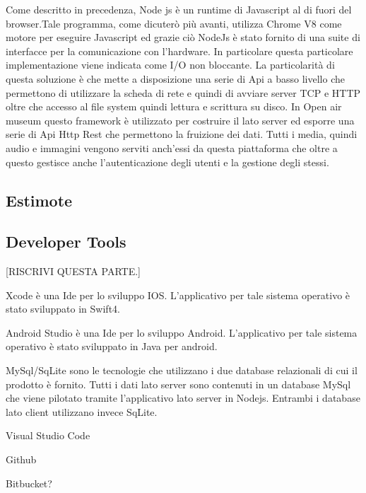 	Come descritto in precedenza, Node js è un runtime di Javascript al di fuori del browser.Tale programma, come dicuterò più avanti, utilizza Chrome V8\cite{V8} come motore per eseguire Javascript ed grazie ciò NodeJs è stato fornito di una suite di interfacce per la comunicazione con l'hardware. In particolare questa particolare implementazione viene indicata come I/O non bloccante\cite{AsincIO}. La particolarità di questa soluzione è che mette a disposizione una serie di Api a basso livello che permettono di utilizzare la scheda di rete e quindi di avviare server TCP e HTTP oltre che accesso al file system quindi lettura e scrittura su disco. In Open air museum questo framework è utilizzato per costruire il lato server ed esporre una serie di Api Http Rest che permettono la fruizione dei dati. Tutti i media, quindi audio e immagini vengono serviti anch’essi da questa piattaforma che oltre a questo gestisce anche l’autenticazione degli utenti e la gestione degli stessi. \vspace{5mm}
	
	\subsection{Estimote}\vspace{5mm}
	
	\subsection{Developer Tools}\vspace{5mm}
	
	[RISCRIVI QUESTA PARTE.]

	Xcode è una Ide per lo sviluppo IOS. L’applicativo per tale sistema operativo è stato sviluppato in Swift4.\vspace{5mm}

	Android Studio è una Ide per lo sviluppo Android. L’applicativo per tale sistema operativo è stato sviluppato in Java per android.\vspace{5mm}

	MySql/SqLite sono le tecnologie che utilizzano i due database relazionali di cui il prodotto è fornito. Tutti i dati lato server sono contenuti in un database MySql che viene pilotato tramite l’applicativo lato server in Nodejs. Entrambi i database lato client utilizzano invece SqLite. 
	
	Visual Studio Code
	
	Github
	
	Bitbucket?
	
